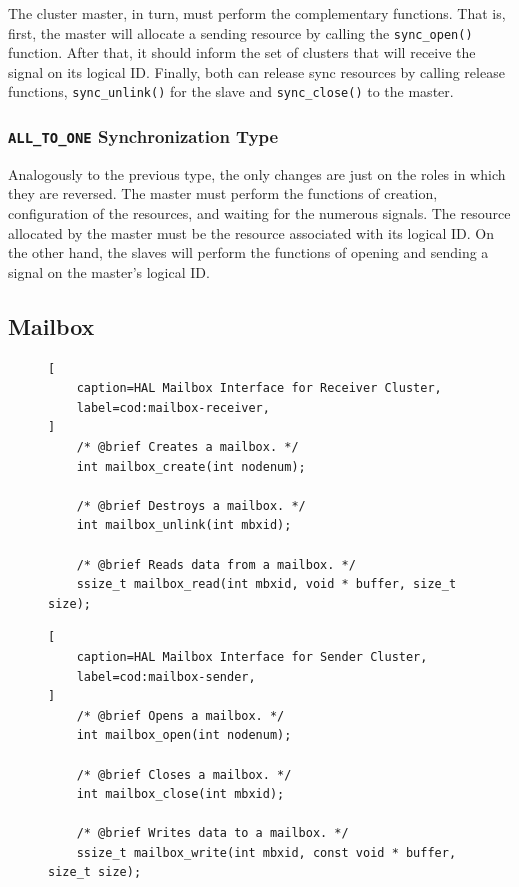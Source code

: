 				The cluster master, in turn, must perform the complementary functions.
				That is, first, the master will allocate a sending resource by calling
				the \texttt{sync\_open()} function.
				After that, it should inform the set of clusters that will receive the
				signal on its logical ID.
				Finally, both can release sync resources by calling release functions,
				\texttt{sync\_unlink()} for the slave and \texttt{sync\_close()} to
				the master.

			\subsubsection*{\texttt{ALL\_TO\_ONE} Synchronization Type}

				Analogously to the previous type, the only changes are just on
				the roles in which they are reversed.
				The master must perform the functions of creation, configuration
				of the resources, and waiting for the numerous signals.
				The resource allocated by the master must be the resource
				associated with its logical ID.
				On the other hand, the slaves will perform the functions of
				opening and sending a signal on the master's logical ID.

	\subsection{Mailbox}

\begin{figure}[t]
\begin{lstlisting}[
	caption=HAL Mailbox Interface for Receiver Cluster,
	label=cod:mailbox-receiver,
]
	/* @brief Creates a mailbox. */
	int mailbox_create(int nodenum);

	/* @brief Destroys a mailbox. */
	int mailbox_unlink(int mbxid);

	/* @brief Reads data from a mailbox. */
	ssize_t mailbox_read(int mbxid, void * buffer, size_t size);
\end{lstlisting}
\end{figure}

\begin{figure}[t]
\begin{lstlisting}[
	caption=HAL Mailbox Interface for Sender Cluster,
	label=cod:mailbox-sender,
]
	/* @brief Opens a mailbox. */
	int mailbox_open(int nodenum);

	/* @brief Closes a mailbox. */
	int mailbox_close(int mbxid);

	/* @brief Writes data to a mailbox. */
	ssize_t mailbox_write(int mbxid, const void * buffer, size_t size);
\end{lstlisting}
\end{figure}

